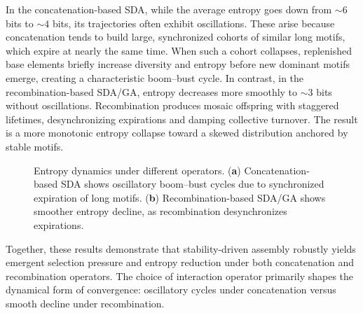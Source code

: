 \documentclass[life,article,submit,pdftex,moreauthors]{Definitions/mdpi}
\begin{document}
In the concatenation-based SDA, while the average entropy goes down from $\sim6$ bits to $\sim4$ bits, its trajectories often exhibit oscillations. These arise because concatenation tends to build large, synchronized cohorts of similar long motifs, which expire at nearly the same time. When such a cohort collapses, replenished base elements briefly increase diversity and entropy before new dominant motifs emerge, creating a characteristic boom–bust cycle. In contrast, in the recombination-based SDA/GA, entropy decreases more smoothly to $\sim3$ bits without oscillations. Recombination produces mosaic offspring with staggered lifetimes, desynchronizing expirations and damping collective turnover. The result is a more monotonic entropy collapse toward a skewed distribution anchored by stable motifs.

\begin{figure}[H]
\centering
{}
\hfill
{}
\caption{Entropy dynamics under different operators. (\textbf{a}) Concatenation-based SDA shows oscillatory boom–bust cycles due to synchronized expiration of long motifs. (\textbf{b}) Recombination-based SDA/GA shows smoother entropy decline, as recombination desynchronizes expirations.}
\label{fig:entropy-comparison}
\end{figure}


Together, these results demonstrate that stability-driven assembly robustly yields emergent selection pressure and entropy reduction under both concatenation and recombination operators. The choice of interaction operator primarily shapes the dynamical form of convergence: oscillatory cycles under concatenation versus smooth decline under recombination.
\end{document}
